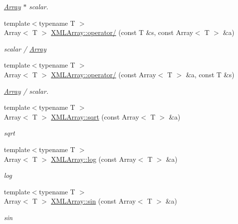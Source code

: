 \begin{DoxyCompactItemize}
\begin{DoxyCompactList}\small\item\em \mbox{\hyperlink{classXMLArray_1_1Array}{Array}} $\ast$ scalar. \end{DoxyCompactList}\item 
{\footnotesize template$<$typename T $>$ }\\Array$<$ T $>$ \mbox{\hyperlink{namespaceXMLArray_a664f129a59f9d36a6e46ee4af2de6116}{X\+M\+L\+Array\+::operator/}} (const T \&s, const Array$<$ T $>$ \&a)
\begin{DoxyCompactList}\small\item\em scalar / \mbox{\hyperlink{classXMLArray_1_1Array}{Array}} \end{DoxyCompactList}\item 
{\footnotesize template$<$typename T $>$ }\\Array$<$ T $>$ \mbox{\hyperlink{namespaceXMLArray_a719499a85d182af00fc9ecd23c8928e0}{X\+M\+L\+Array\+::operator/}} (const Array$<$ T $>$ \&a, const T \&s)
\begin{DoxyCompactList}\small\item\em \mbox{\hyperlink{classXMLArray_1_1Array}{Array}} / scalar. \end{DoxyCompactList}\item 
{\footnotesize template$<$typename T $>$ }\\Array$<$ T $>$ \mbox{\hyperlink{namespaceXMLArray_a6b3f8ee1d76ecaf106e799ed6278b303}{X\+M\+L\+Array\+::sqrt}} (const Array$<$ T $>$ \&a)
\begin{DoxyCompactList}\small\item\em sqrt \end{DoxyCompactList}\item 
{\footnotesize template$<$typename T $>$ }\\Array$<$ T $>$ \mbox{\hyperlink{namespaceXMLArray_adea4803e894b23debf6555f41722fc8a}{X\+M\+L\+Array\+::log}} (const Array$<$ T $>$ \&a)
\begin{DoxyCompactList}\small\item\em log \end{DoxyCompactList}\item 
{\footnotesize template$<$typename T $>$ }\\Array$<$ T $>$ \mbox{\hyperlink{namespaceXMLArray_a2d0e4bcea1d1d685dc5ba46bba31ff5b}{X\+M\+L\+Array\+::sin}} (const Array$<$ T $>$ \&a)
\begin{DoxyCompactList}\small\item\em sin \end{DoxyCompactList}\item 

\end{DoxyCompactItemize}
